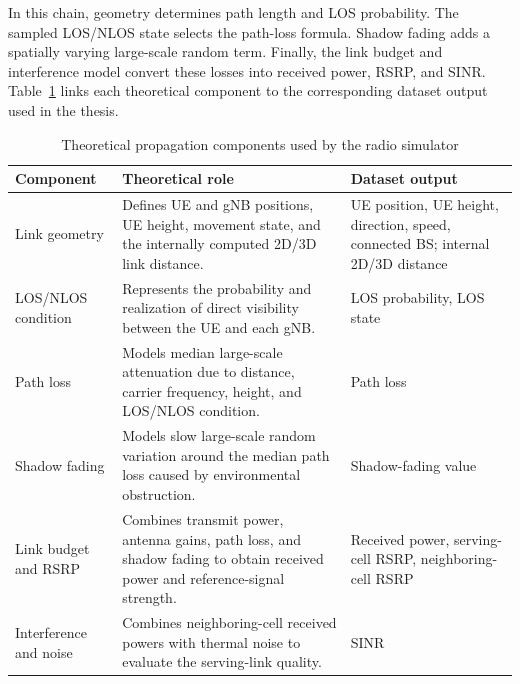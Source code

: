 In this chain, geometry determines path length and LOS probability. The sampled LOS/NLOS state selects the path-loss formula. Shadow fading adds a spatially varying large-scale random term. Finally, the link budget and interference model convert these losses into received power, RSRP, and SINR. Table~\ref{tab:theoretical-propagation-components} links each theoretical component to the corresponding dataset output used in the thesis.

\begin{table}[H]
\centering
\caption[Theoretical propagation components used by the radio simulator]{Theoretical propagation components used by the radio simulator \cite{3gpp_38901,3gpp_36777,3gpp_38215}}
\small
\renewcommand{\arraystretch}{1.12}
\renewcommand{\tabularxcolumn}[1]{>{\raggedright\arraybackslash}p{#1}}
\begin{tabularx}{\textwidth}{>{\raggedright\arraybackslash}p{2.8cm}>{\raggedright\arraybackslash}X>{\raggedright\arraybackslash}p{4.5cm}}
\toprule
Component & Theoretical role & Dataset output\\
\midrule
Link geometry & Defines UE and gNB positions, UE height, movement state, and the internally computed 2D/3D link distance. & UE position, UE height, direction, speed, connected BS; internal 2D/3D distance\\
\addlinespace[2pt]
LOS/NLOS condition & Represents the probability and realization of direct visibility between the UE and each gNB. & LOS probability, LOS state\\
\addlinespace[2pt]
Path loss & Models median large-scale attenuation due to distance, carrier frequency, height, and LOS/NLOS condition. & Path loss\\
\addlinespace[2pt]
Shadow fading & Models slow large-scale random variation around the median path loss caused by environmental obstruction. & Shadow-fading value\\
\addlinespace[2pt]
Link budget and RSRP & Combines transmit power, antenna gains, path loss, and shadow fading to obtain received power and reference-signal strength. & Received power, serving-cell RSRP, neighboring-cell RSRP\\
\addlinespace[2pt]
Interference and noise & Combines neighboring-cell received powers with thermal noise to evaluate the serving-link quality. & SINR\\
\bottomrule
\end{tabularx}
\renewcommand{\arraystretch}{1.0}
\label{tab:theoretical-propagation-components}
\end{table}

